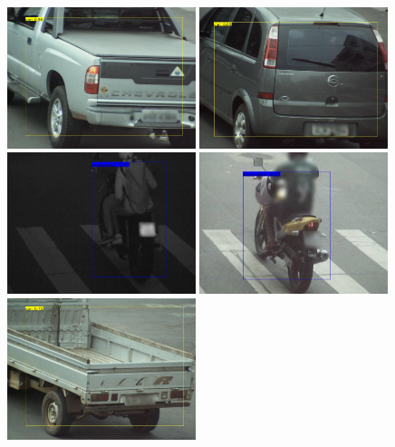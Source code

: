 \documentclass[12pt,oneside]{memoir}
\begin{document}
\begin{figure}[!htbp]
\centering
  \includegraphics[width=0.49\textwidth]{matfmaster/yolo/v4/basic_augmentation/car_0.jpg}
  \includegraphics[width=0.49\textwidth]{matfmaster/yolo/v4/basic_augmentation/car_1.jpg}
  \includegraphics[width=0.49\textwidth]{matfmaster/yolo/v4/basic_augmentation/motorbike_0.jpg}
  \includegraphics[width=0.49\textwidth]{matfmaster/yolo/v4/basic_augmentation/motorbike_1.jpg}
  \includegraphics[width=0.49\textwidth]{matfmaster/yolo/v4/basic_augmentation/truck_0.jpg}

\end{figure}
\end{document}

